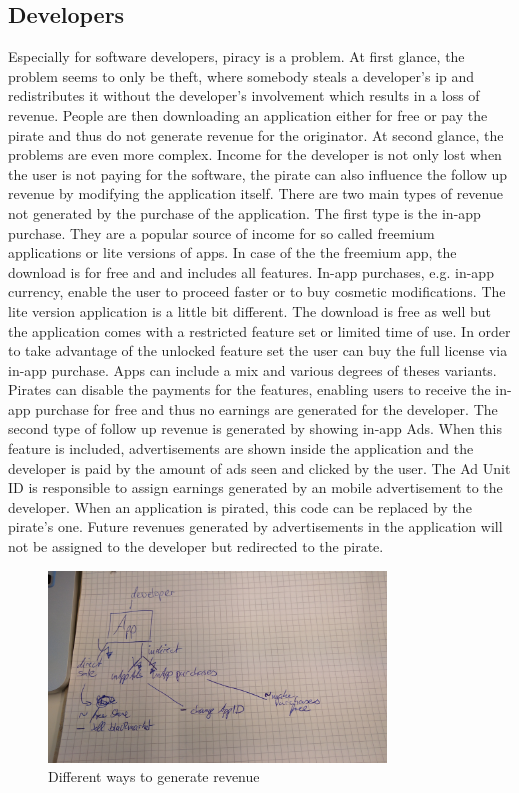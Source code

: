 \subsection{Developers} \label{subsection:foundation-piracy-developers}
Especially for software developers, piracy is a problem.
At first glance, the problem seems to only be theft, where somebody steals a developer's \gls{ip} and redistributes it without the developer’s involvement which results in a loss of revenue.
People are then downloading an application either for free or pay the pirate and thus do not generate revenue for the originator.
\newline
At second glance, the problems are even more complex.
Income for the developer is not only lost when the user is not paying for the software, the pirate can also influence the follow up revenue by modifying the application itself.
There are two main types of revenue not generated by the purchase of the application.
The first type is the in-app purchase.
They are a popular source of income for so called freemium applications or lite versions of apps.
In case of the the freemium app, the download is for free and and includes all features. In-app purchases, e.g. in-app currency, enable the user to proceed faster or to buy cosmetic modifications.
The lite version application is a little bit different. The download is free as well but the application comes with a restricted feature set or limited time of use.
In order to take advantage of the unlocked feature set the user can buy the full license via in-app purchase.
Apps can include a mix and various degrees of theses variants.
Pirates can disable the payments for the features, enabling users to receive the in-app purchase for free and thus no earnings are generated for the developer.
\newline
The second type of follow up revenue is generated by showing in-app Ads.
When this feature is included, advertisements are shown inside the application and the developer is paid by the amount of ads seen and clicked by the user.
The Ad Unit ID \cite{googleAdmob} is responsible to assign earnings generated by an mobile advertisement to the developer.
When an application is pirated, this code can be replaced by the pirate's one. Future revenues generated by advertisements in the application will not be assigned to the developer but redirected to the pirate.
\newline
\begin{figure}[h]
    \centering
    \includegraphics[width=0.8\textwidth]{data/revenue.jpg}
    \caption{Different ways to generate revenue}
    \label{fig:revenue}
\end{figure}
